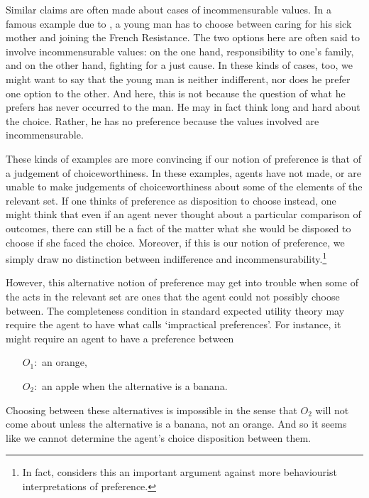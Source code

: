 Similar claims are often made about cases of incommensurable values. In a famous example due to \citet{Sartre1945}, a young man has to choose between caring for his sick mother and joining the French Resistance. The two options here are often said to involve incommensurable values: on the one hand, responsibility to one's family, and on the other hand, fighting for a just cause. In these kinds of cases, too, we might want to say that the young man is neither indifferent, nor does he prefer one option to the other. And here, this is not because the question of what he prefers has never occurred to the man. He may in fact think long and hard about the choice. Rather, he has no preference because the values involved are incommensurable.

These kinds of examples are more convincing if our notion of preference is that of a judgement of choiceworthiness. In these examples, agents have not made, or are unable to make judgements of choiceworthiness about some of the elements of the relevant set. If one thinks of preference as disposition to choose instead, one might think that even if an agent never thought about a particular comparison of outcomes, there can still be a fact of the matter what she would be disposed to choose if she faced the choice. Moreover, if this is our notion of preference, we simply draw no distinction between indifference and incommensurability.\footnote{In fact, \citet{Joyce1999} considers this an important argument against more behaviourist interpretations of preference.}

However, this alternative notion of preference may get into trouble when some of the acts in the relevant set are ones that the agent could not possibly choose between. The completeness condition in standard expected utility theory may require the agent to have what \citet{Broome1991} calls `impractical preferences'. For instance, it might require an agent to have a preference between
\begin{itemize}
\item[$O_1:$] an orange,
\item[$O_2:$] an apple when the alternative is a banana.
\end{itemize}
Choosing between these alternatives is impossible in the sense that $O_2$ will not come about unless the alternative is a banana, not an orange. And so it seems like we cannot determine the agent's choice disposition between them.

